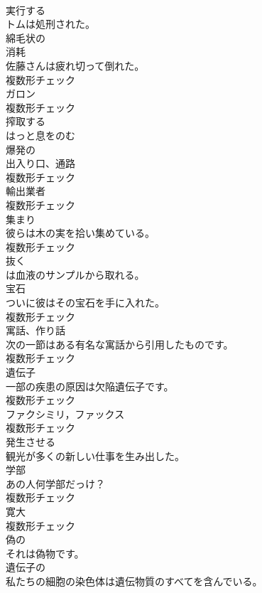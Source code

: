 \documentclass[8pt]{extreport}
\begin{document}
\begin{CJK}{UTF8}{min}
\\	[動詞]	実行する	
\\	トムは処刑された。	
\\	[形容詞]	綿毛状の	
\\	[名詞]	消耗	
\\	佐藤さんは疲れ切って倒れた。	
\\	複数形チェック
\\	[名詞]	ガロン	
\\	複数形チェック
\\	[動詞]	搾取する	
\\	[動詞]	はっと息をのむ	
\\	[形容詞]	爆発の	
\\	[名詞]	出入り口、通路	
\\	複数形チェック
\\	[名詞]	輸出業者	
\\	複数形チェック
\\	[名詞]	集まり	
\\	彼らは木の実を拾い集めている。	
\\	複数形チェック
\\	[動詞]	抜く	
\\	は血液のサンプルから取れる。	
\\	[名詞]	宝石	
\\	ついに彼はその宝石を手に入れた。	
\\	複数形チェック
\\	[名詞]	寓話、作り話	
\\	次の一節はある有名な寓話から引用したものです。	
\\	複数形チェック
\\	[名詞]	遺伝子	
\\	一部の疾患の原因は欠陥遺伝子です。	
\\	複数形チェック
\\	[名詞]	ファクシミリ，ファックス	
\\	複数形チェック
\\	[動詞]	発生させる	
\\	観光が多くの新しい仕事を生み出した。	
\\	[名詞]	学部	
\\	あの人何学部だっけ？	
\\	複数形チェック
\\	[名詞]	寛大	
\\	複数形チェック
\\	[形容詞]	偽の	
\\	それは偽物です。	
\\	[形容詞]	遺伝子の	
\\	私たちの細胞の染色体は遺伝物質のすべてを含んでいる。	

\end{CJK}
\end{document}
